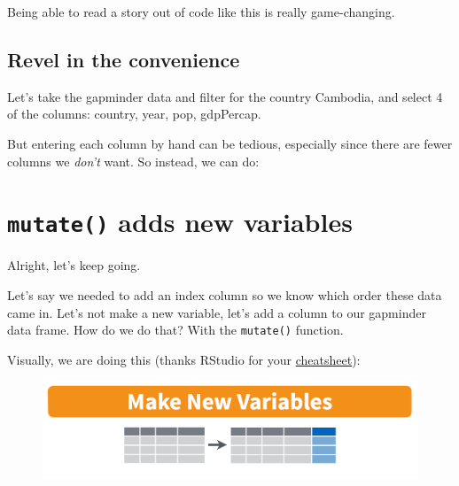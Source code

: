 \documentclass[]{book}
\newenvironment{Shaded}{\begin{snugshade}}{\end{snugshade}}
\newcommand{\KeywordTok}[1]{\textcolor[rgb]{0.13,0.29,0.53}{\textbf{{#1}}}}
\newcommand{\StringTok}[1]{\textcolor[rgb]{0.31,0.60,0.02}{{#1}}}
\newcommand{\CommentTok}[1]{\textcolor[rgb]{0.56,0.35,0.01}{\textit{{#1}}}}
\newcommand{\NormalTok}[1]{{#1}}
\theoremstyle{definition}
\theoremstyle{definition}
\theoremstyle{definition}
\theoremstyle{remark}
\begin{document}
Being able to read a story out of code like this is really
game-changing.

\subsection{Revel in the convenience}\label{revel-in-the-convenience}

Let's take the gapminder data and filter for the country Cambodia, and
select 4 of the columns: country, year, pop, gdpPercap.

\begin{Shaded}
\end{Shaded}

But entering each column by hand can be tedious, especially since there
are fewer columns we \emph{don't} want. So instead, we can do:

\begin{Shaded}
\end{Shaded}

\section{\texorpdfstring{\texttt{mutate()} adds new
variables}{mutate() adds new variables}}\label{mutate-adds-new-variables}

Alright, let's keep going.

Let's say we needed to add an index column so we know which order these
data came in. Let's not make a new variable, let's add a column to our
gapminder data frame. How do we do that? With the \texttt{mutate()}
function.

Visually, we are doing this (thanks RStudio for your
\href{http://www.rstudio.com/wp-content/uploads/2015/02/data-wrangling-cheatsheet.pdf}{cheatsheet}):

\begin{figure}[htbp]
\centering
\includegraphics{img/rstudio-cheatsheet-mutate.png}
\caption{}
\end{figure}
\end{document}
